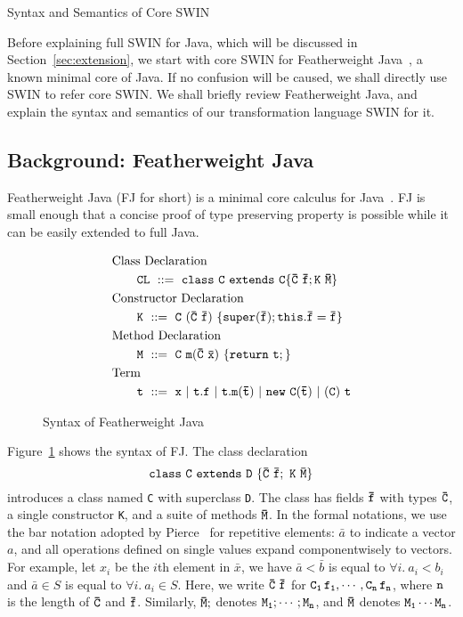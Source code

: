 \begin{section}{Syntax and Semantics of Core SWIN}
\label{tw-fj}

Before explaining full SWIN for Java, which will
be discussed in Section~\ref{sec:extension}, we start with 
core SWIN for Featherweight Java~\cite{fj},
a known minimal core of Java. %
If no confusion will be caused, we shall directly use SWIN to refer core SWIN.
We shall briefly review Featherweight Java, and 
explain the syntax and semantics of our transformation language SWIN for it.

\subsection{Background: Featherweight Java}
Featherweight Java (FJ for short) is a minimal core calculus for Java~\cite{fj}. 
FJ is small enough that a concise proof of type preserving
property is possible while it can be easily extended to full Java.

\begin{figure}[ht]
\begin{align*}
  & \mbox{Class Declaration}\\
  & \qquad\tt CL\ ::=\  \tt class\ C\ extends\ C \{\bar{C}\ \bar{f}; K\ \bar{M}\}\\
  & \mbox{Constructor Declaration}\\
  & \qquad\tt K \ ::=\  \tt C\ (\bar{C}\ \bar{f})\ \{ super(\bar{f}); this.\bar{f}=\bar{f}\}\\
  & \mbox{Method Declaration}\\
  & \qquad\tt M \ ::=\  \tt C\ m(\bar{C}\ \bar{x})\ \{ return\ t;\}\\
  & \mbox{Term}\\
  & \qquad\tt t \ ::=\  \tt x\ |\ t.f\ |\ t.m(\bar{t})\ |\ new\ C(\bar{t})\ |\ (C)\ t
\end{align*}
\caption{Syntax of Featherweight Java}
\label{fj-syntax}
\end{figure}
Figure~\ref{fj-syntax} shows the syntax of FJ.
The class declaration 
\[
\tt class\ C\ extends\ D\ \{\bar{C}\ \bar{f};\ K\ \bar{M}\}
\]
introduces a class named \verb|C| with superclass \verb|D|. The class has fields $\tt\bar{f}$ with types $\tt\bar{C}$,
a single constructor \verb|K|, and a suite of methods $\tt\bar{M}$.
In the formal notations, we use the bar notation adopted by Pierce~\cite{tpl} for repetitive elements: 
$\bar{a}$ to indicate a vector $a$,
and all operations defined on single values expand componentwisely to
vectors. For example, let $x_i$ be the $i$th element in $\bar{x}$, we
have $\bar{a}<\bar{b}$ is equal to $\forall i.\ a_i < b_i$ and $\bar{a}
\in S$ is equal to $\forall i.\ a_i \in S$.
Here, we write $\tt \bar{C}\ \bar{f}$ for $\tt C_{1}\,f_{1},\cdots,
C_{n}\,f_{n}$, where $\tt n$ is the length of $\tt\bar{C}$ and $\tt\bar{f}$.
Similarly, $\tt \bar{M};$ denotes $\tt M_1;\cdots ;M_n$, and $\tt \bar{M}$ 
denotes $\tt M_1\cdots M_n$.


\end{section}
